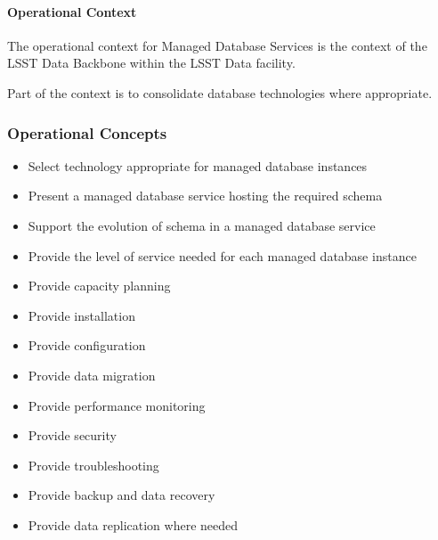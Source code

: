 \paragraph{Operational Context}

The operational context for Managed Database Services is the context
of the LSST Data Backbone within the LSST Data facility.

Part of the context is to consolidate database technologies where
appropriate.

\subsubsection{Operational Concepts}

\begin{itemize}

\item Select technology appropriate for managed database instances
\item Present a managed database service hosting the required schema
\item Support the evolution of schema in a managed database service
\item Provide the level of service needed for each managed database instance
\item Provide capacity planning
\item Provide installation
\item Provide configuration
\item Provide data migration
\item Provide performance monitoring
\item Provide security
\item Provide troubleshooting
\item Provide backup and data recovery
\item Provide data replication where needed

\end{itemize}
